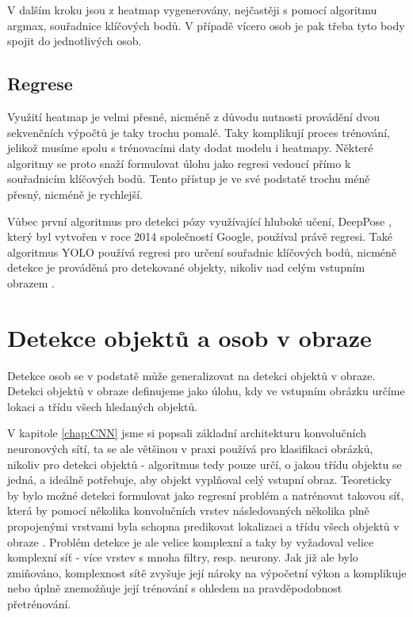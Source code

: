 V dalším kroku jsou z heatmap vygenerovány, nejčastěji s pomocí algoritmu
argmax, souřadnice klíčových bodů. V případě vícero osob je pak třeba tyto body
spojit do jednotlivých osob.

\subsection{Regrese}

Využití heatmap je velmi přesné, nicméně z důvodu nutnosti provádění dvou
sekvenčních výpočtů je taky trochu pomalé. Taky komplikují proces trénování,
jelikož musíme spolu s trénovacími daty dodat modelu i heatmapy. Některé
algoritmy se proto snaží formulovat úlohu jako regresi vedoucí přímo k
souřadnicím klíčových bodů. Tento přístup je ve své podstatě trochu méně
přesný, nicméně je rychlejší.

Vůbec první algoritmus pro detekci pózy využívající hluboké učení, DeepPose
\cite{deeppose}, který byl vytvořen v roce 2014 společností Google, používal
právě regresi. Také algoritmus YOLO používá regresi pro určení souřadnic
klíčových bodů, nicméně detekce je prováděná pro detekované objekty, nikoliv
nad celým vstupním obrazem \cite{yolo-pose}.


\section{Detekce objektů a osob v obraze}
\label{sec:obj_det}

Detekce osob se v podstatě může generalizovat na detekci objektů v obraze.
Detekci objektů v obraze definujeme jako úlohu, kdy ve vstupním obrázku určíme
lokaci a třídu všech hledaných objektů.

V kapitole \ref{chap:CNN} jsme si popsali základní architekturu konvolučních
neuronových sítí, ta se ale většinou v praxi používá pro klasifikaci obrázků,
nikoliv pro detekci objektů - algoritmus tedy pouze určí, o jakou třídu objektu
se jedná, a ideálně potřebuje, aby objekt vyplňoval celý vstupní obraz.
Teoreticky by bylo možné detekci formulovat jako regresní problém a natrénovat
takovou síť, která by pomocí několika konvolučních vrstev následovaných
několika plně propojenými vrstvami byla schopna predikovat lokalizaci a třídu
všech objektů v obraze \cite{szegedy}. Problém detekce je ale velice komplexní
a taky by vyžadoval velice komplexní síť - více vrstev s mnoha filtry, resp.
neurony. Jak již ale bylo zmiňováno, komplexnost sítě zvyšuje její nároky na
výpočetní výkon a komplikuje nebo úplně znemožňuje její trénování s ohledem na
pravděpodobnost přetrénování.

